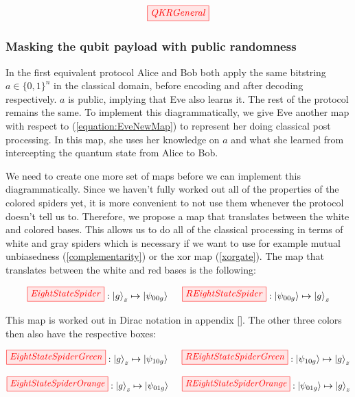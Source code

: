 \documentclass[]{article}
\begin{document}
\begin{equation}
\label{equation:QKRGeneral}
	\tikzfig{QKRGeneral}
\end{equation}


\subsubsection{Masking the qubit payload with public randomness}
\label{section:maskingqubitpubrand}
In the first equivalent protocol Alice and Bob both apply the same bitstring $a \in \{0,1\}^n$ in the classical domain, before encoding and after decoding respectively. $a$ is public, implying that Eve also learns it. The rest of the protocol remains the same. To implement this diagrammatically, we give Eve another map with respect to (\ref{equation:EveNewMap}) to represent her doing classical post processing. In this map, she uses her knowledge on $a$ and what she learned from intercepting the quantum state from Alice to Bob.

We need to create one more set of maps before we can implement this diagrammatically. Since we haven't fully worked out all of the properties of the colored spiders yet, it is more convenient to not use them whenever the protocol doesn't tell us to. Therefore, we propose a map that translates between the white and colored bases. This allows us to do all of the classical processing in terms of white and gray spiders which is necessary if we want to use for example mutual unbiasedness (\ref{complementarity}) or the xor map (\ref{xorgate}). The map that translates between the white and red bases is the following:

\begin{equation}
\label{equation:EightStateSpider}
\tikzfig{EightStateSpider} :
\ket{g}_z \mapsto \ket{\psi_{00g}} ~~~~ \tikzfig{REightStateSpider} :
\ket{\psi_{00g}} \mapsto \ket{g}_z
\end{equation}

This map is worked out in Dirac notation in appendix \ref{}. The other three colors then also have the respective boxes:

\begin{equation}
\label{equation:EightStateSpiderGreen}
\tikzfig{EightStateSpiderGreen} :
\ket{g}_z \mapsto \ket{\psi_{10g}} ~~~~ \tikzfig{REightStateSpiderGreen} :
\ket{\psi_{10g}} \mapsto \ket{g}_z
\end{equation}

\begin{equation}
\label{equation:EightStateSpiderOrange}
\tikzfig{EightStateSpiderOrange} :
\ket{g}_z \mapsto \ket{\psi_{01g}} ~~~~ \tikzfig{REightStateSpiderOrange} :
\ket{\psi_{01g}} \mapsto \ket{g}_z
\end{equation}
\end{document}
